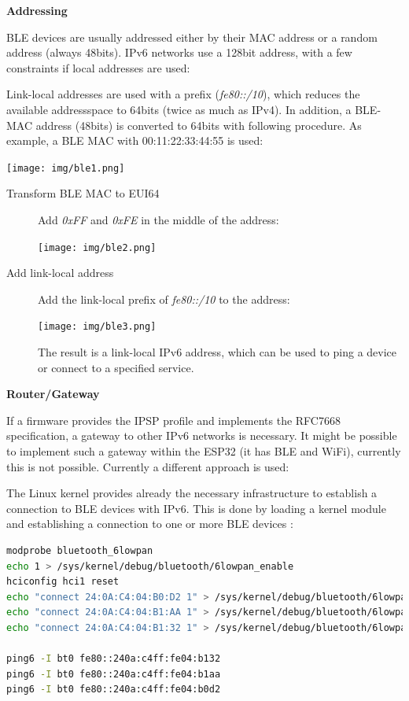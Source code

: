 \documentclass[]{scrreprt}%
\begin{document}
\textbf{Addressing}

BLE devices are usually addressed either by their MAC address or a random address (always 48bits).
IPv6 networks use a 128bit address, with a few constraints if local addresses are used:

Link-local addresses are used with a prefix (\textit{fe80::/10}), which reduces the available addressspace to 64bits (twice as much as IPv4).
In addition, a BLE-MAC address (48bits) is converted to 64bits with following procedure. As example, a BLE MAC with 00:11:22:33:44:55 is used:


    
\begin{center}
      \texttt{[image: img/ble1.png]}
\end{center}
\begin{description}
 \item[Transform BLE MAC to EUI64] Add \textit{0xFF} and  \textit{0xFE} in the middle of the address:
    \begin{center}
      \texttt{[image: img/ble2.png]}
    \end{center}
 \item[Add link-local address] Add the link-local prefix of \textit{fe80::/10} to the address:
    \begin{center}
      \texttt{[image: img/ble3.png]}
    \end{center}
    The result is a link-local IPv6 address, which can be used to ping a device or connect to a specified service.
\end{description}

\textbf{Router/Gateway}


If a firmware provides the IPSP profile and implements the RFC7668 specification, a gateway to other IPv6 networks is necessary.
It might be possible to implement such a gateway within the ESP32 (it has BLE and WiFi), currently this is not possible.
Currently a different approach is used:

The Linux kernel provides already the necessary infrastructure to establish a connection to BLE devices with IPv6.
This is done by loading a kernel module and establishing a connection to one or more BLE devices \cite{NORDIC2}:

\begin{lstlisting}[frame=single,language=bash,basicstyle=\footnotesize] 
modprobe bluetooth_6lowpan
echo 1 > /sys/kernel/debug/bluetooth/6lowpan_enable
hciconfig hci1 reset
echo "connect 24:0A:C4:04:B0:D2 1" > /sys/kernel/debug/bluetooth/6lowpan_control
echo "connect 24:0A:C4:04:B1:AA 1" > /sys/kernel/debug/bluetooth/6lowpan_control
echo "connect 24:0A:C4:04:B1:32 1" > /sys/kernel/debug/bluetooth/6lowpan_control

ping6 -I bt0 fe80::240a:c4ff:fe04:b132
ping6 -I bt0 fe80::240a:c4ff:fe04:b1aa
ping6 -I bt0 fe80::240a:c4ff:fe04:b0d2
\end{lstlisting}
\end{document}
